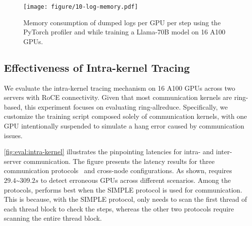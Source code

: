 \begin{figure}
    \centering
    \texttt{[image: figure/10-log-memory.pdf]}
    \vspace{-2mm}
    \caption{Memory consumption of dumped logs per GPU per step using the PyTorch profiler and \sysname{} while training a Llama-70B model on 16 A100 GPUs.}
    \label{fig:log-overhead}
    \vspace{-4mm}
\end{figure}


\subsection{Effectiveness of Intra-kernel Tracing}

We evaluate the intra-kernel tracing mechanism on 16 A100 GPUs across two servers with RoCE connectivity. Given that most communication kernels are ring-based, this experiment focuses on evaluating ring-allreduce. Specifically, we customize the training script composed solely of communication kernels, with one GPU intentionally suspended to simulate a hang error caused by communication issues. 

\autoref{fig:eval:intra-kernel} illustrates the pinpointing latencies for intra- and inter-server communication.
The figure presents the latency results for three communication protocols~\cite{NVIDIA_NCCL_User_Guide} and cross-node configurations.
As shown, \sysname{} requires $29.4\text{\textasciitilde}309.2s$ to detect erroneous GPUs across different scenarios. Among the protocols, \sysname{} performs best when the SIMPLE protocol is used for communication. This is because, with the SIMPLE protocol, \sysname{} only needs to scan the first thread of each thread block to check the steps, whereas the other two protocols require scanning the entire thread block.


